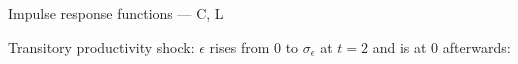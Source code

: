 \documentclass{beamer}
\begin{document}
\begin{frame}{Impulse response functions --- C, L}

  Transitory productivity shock: $\epsilon$ rises from 0 to $\sigma_\epsilon$ at $t=2$ and is at 0 afterwards:
\begin{center}
\vspace{-5mm}
\begin{figure}[h!]
\end{figure}
\end{center}

\end{frame}
\end{document}
